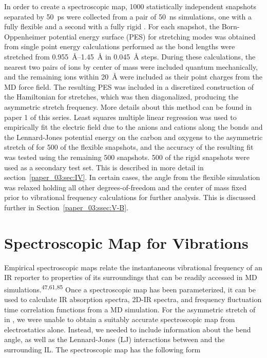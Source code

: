 In order to create a spectroscopic map, \num{1000} statistically independent snapshots separated by \SI{50}{\pico\second} were collected from a pair of \SI{50}{\nano\second} simulations, one with a fully flexible  and a second with a fully rigid . For each snapshot, the Born-Oppenheimer potential energy surface (PES) for  stretching modes was obtained from single point energy calculations performed as the  bond lengths were stretched from \SIrange{0.955}{1.45}{\angstrom} in \SI{0.045}{\angstrom} steps. During these calculations, the nearest two pairs of ions by center of mass were included quantum mechanically, and the remaining ions within \SI{20}{\angstrom} were included as their point charges from the MD force field. The resulting PES was included in a discretized construction of the Hamiltonian for  stretches, which was then diagonalized, producing the asymmetric stretch frequency. More details about this method can be found in paper 1 of this series. Least squares multiple linear regression was used to empirically fit the electric field due to the anions and cations along the  bonds and the Lennard-Jones potential energy on the  carbon and oxygens to the asymmetric stretch of  for \num{500} of the flexible snapshots, and the accuracy of the resulting fit was tested using the remaining \num{500} snapshots. \num{500} of the rigid snapshots were used as a secondary test set. This is described in more detail in section~\ref{paper_03:sec:IV}. In certain cases, the  angle from the flexible simulation was relaxed holding all other degrees-of-freedom and the  center of mass fixed prior to vibrational frequency calculations for further analysis. This is discussed further in Section~\ref{paper_03:ssec:V-B}.

\section{Spectroscopic Map for  Vibrations}
\label{paper_03:sec:III}

Empirical spectroscopic maps relate the instantaneous vibrational frequency of an IR reporter to properties of its surroundings that can be readily accessed in MD simulations.\textsuperscript{47,61,85} Once a spectroscopic map has been parameterized, it can be used to calculate IR absorption spectra, 2D-IR spectra, and frequency fluctuation time correlation functions from a MD simulation. For the asymmetric stretch of  in \ce{[C4C1im][PF6]}, we were unable to obtain a suitably accurate spectroscopic map from electrostatics alone. Instead, we needed to include information about the  bend angle, as well as the Lennard-Jones (LJ) interactions between  and the surrounding IL. The spectroscopic map has the following form

